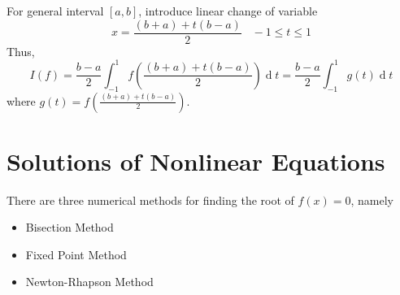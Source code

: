 \documentclass[12pt]{article}
\theoremstyle{definition}
\DeclareMathOperator{\diff}{d}
\begin{document}
For general interval $[a,b]$, introduce linear change of variable
\[
x=\frac{(b+a)+t(b-a)}{2}\;\;\;-1\leq t\leq 1
\]
Thus,
\[
I(f) =\frac{b-a}{2}\int_{-1}^1f\left(\frac{(b+a)+t(b-a)}{2}\right)\diff t = \frac{b-a}{2}\int_{-1}^1g(t)\diff t
\]
where $g(t)=f\left(\frac{(b+a)+t(b-a)}{2}\right)$.
\clearpage
\section{Solutions of Nonlinear Equations}
There are three numerical methods for finding the root of $f(x)=0$, namely
\begin{itemize}
  \item Bisection Method
  \item Fixed Point Method
  \item Newton-Rhapson Method
\end{itemize}
\end{document}
